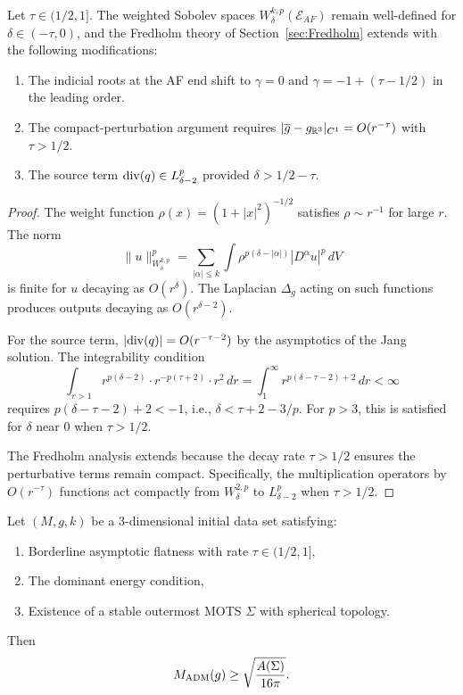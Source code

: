 \begin{proposition}\label{prop:WeightedExtension}
Let $\tau \in (1/2, 1]$. The weighted Sobolev spaces $W^{k,p}_\delta(\mathcal{E}_{AF})$ remain well-defined for $\delta \in (-\tau, 0)$, and the Fredholm theory of Section~\ref{sec:Fredholm} extends with the following modifications:
\begin{enumerate}
    \item The indicial roots at the AF end shift to $\gamma = 0$ and $\gamma = -1 + (\tau - 1/2)$ in the leading order.
    \item The compact-perturbation argument requires $|\overline{g} - g_{\mathbb{R}^3}|_{C^1} = O(r^{-\tau})$ with $\tau > 1/2$.
    \item The source term $\mathrm{div}(q) \in L^p_{\delta-2}$ provided $\delta > 1/2 - \tau$.
\end{enumerate}
\end{proposition}

\begin{proof}
The weight function $\rho(x) = (1 + |x|^2)^{-1/2}$ satisfies $\rho \sim r^{-1}$ for large $r$. The norm
\[
    \|u\|_{W^{k,p}_\delta}^p = \sum_{|\alpha| \le k} \int \rho^{p(\delta - |\alpha|)} |D^\alpha u|^p \, dV
\]
is finite for $u$ decaying as $O(r^{\delta})$. The Laplacian $\Delta_g$ acting on such functions produces outputs decaying as $O(r^{\delta - 2})$.

For the source term, $|\mathrm{div}(q)| = O(r^{-\tau - 2})$ by the asymptotics of the Jang solution. The integrability condition
\[
    \int_{r > 1} r^{p(\delta - 2)} \cdot r^{-p(\tau + 2)} \cdot r^2 \, dr = \int_1^\infty r^{p(\delta - \tau - 2) + 2} \, dr < \infty
\]
requires $p(\delta - \tau - 2) + 2 < -1$, i.e., $\delta < \tau + 2 - 3/p$. For $p > 3$, this is satisfied for $\delta$ near $0$ when $\tau > 1/2$.

The Fredholm analysis extends because the decay rate $\tau > 1/2$ ensures the perturbative terms remain compact. Specifically, the multiplication operators by $O(r^{-\tau})$ functions act compactly from $W^{2,p}_\delta$ to $L^p_{\delta-2}$ when $\tau > 1/2$.
\end{proof}

\begin{theorem}\label{thm:PenroseBorderline}
Let $(M, g, k)$ be a 3-dimensional initial data set satisfying:
\begin{enumerate}
    \item Borderline asymptotic flatness with rate $\tau \in (1/2, 1]$,
    \item The dominant energy condition,
    \item Existence of a stable outermost MOTS $\Sigma$ with spherical topology.
\end{enumerate}
Then
\begin{equation}
    M_{\mathrm{ADM}}(g) \ge \sqrt{\frac{A(\Sigma)}{16\pi}}.
\end{equation}
\end{theorem}

